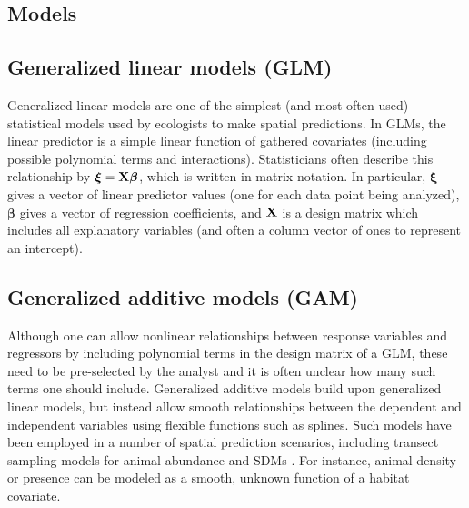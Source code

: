 \documentclass[12pt,fleqn]{article}
\begin{document}
\begin{flushleft}
\section{Models}
\subsection{Generalized linear models (GLM)}

Generalized linear models \citep{McCullaghNelder1989} are one of the simplest (and most often used) statistical models
used by ecologists to make spatial predictions. In GLMs, the linear predictor is a simple linear function of gathered covariates
(including possible polynomial terms and interactions).  Statisticians often describe this relationship by
$\boldsymbol{\xi}={\bf X} \boldsymbol{\beta}$, which is written in matrix notation.  In particular, $\boldsymbol{\xi}$ gives
a vector of linear predictor values (one for each data point being analyzed), $\boldsymbol{\beta}$ gives a vector of regression coefficients, and ${\bf X}$ is a design matrix which includes all explanatory variables (and often a column vector of ones to represent an intercept).

\subsection{Generalized additive models (GAM)}

Although one can allow nonlinear relationships between response variables and regressors by including polynomial terms in the design matrix of a GLM, these need to be pre-selected by the analyst and it is often unclear how many such terms one should include. Generalized additive models \citep[GAMs;][]{HastieTibshirani1999,Wood2006} build upon generalized linear models, but instead allow smooth relationships between the dependent and independent variables using flexible functions such as splines.  Such models have
been employed in a number of spatial prediction scenarios, including transect sampling models for animal abundance \citep{HedleyBuckland2004} and SDMs \citep{GuisanEtAl2002}.  For instance, animal density or presence can be modeled as a smooth, unknown function of a habitat covariate.


\end{flushleft}
\end{document}
